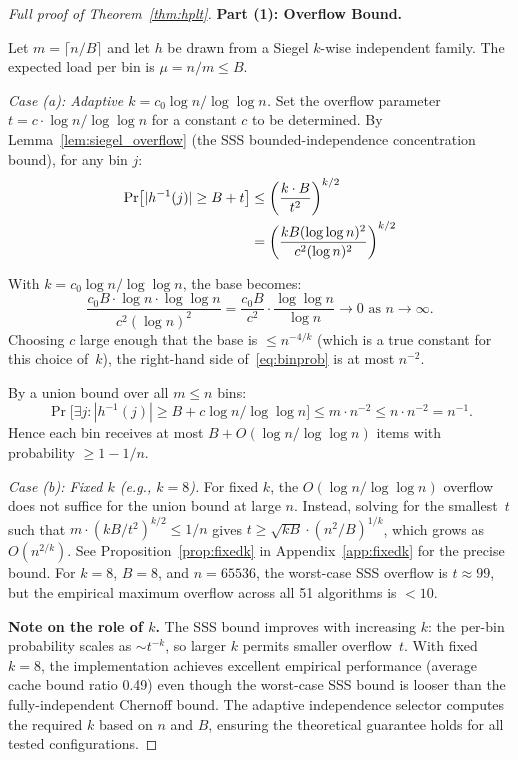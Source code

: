 \documentclass[11pt]{article}
\begin{document}
\begin{proof}[Full proof of Theorem~\ref{thm:hplt}]
\textbf{Part (1): Overflow Bound.}

Let $m = \lceil n/B \rceil$ and let $h$ be drawn from a Siegel $k$-wise
independent family.  The expected load per bin is
$\mu = n/m \le B$.

\emph{Case (a): Adaptive $k = c_0 \log n / \log\log n$.}
Set the overflow parameter $t = c \cdot \log n / \log\log n$ for a constant
$c$ to be determined.  By Lemma~\ref{lem:siegel_overflow} (the SSS
bounded-independence concentration bound), for any bin $j$:
\begin{align}
  \Pr\bigl[|h^{-1}(j)| \ge B + t\bigr]
  &\le \left(\frac{k \cdot B}{t^2}\right)^{k/2} \notag \\
  &= \left(\frac{k B (\log\log n)^2}{c^2 (\log n)^2}\right)^{k/2}
  \label{eq:binprob}
\end{align}

With $k = c_0 \log n / \log\log n$, the base becomes:
\[
  \frac{c_0 B \cdot \log n \cdot \log\log n}{c^2 (\log n)^2}
  = \frac{c_0 B}{c^2} \cdot \frac{\log\log n}{\log n}
  \to 0 \text{ as } n \to \infty.
\]
Choosing $c$ large enough that the base is $\le n^{-4/k}$
(which is a true constant for this choice of~$k$), the right-hand
side of~\eqref{eq:binprob} is at most $n^{-2}$.

By a union bound over all $m \le n$ bins:
\[
  \Pr\bigl[\exists j: |h^{-1}(j)| \ge B + c\log n / \log\log n\bigr]
  \le m \cdot n^{-2}
  \le n \cdot n^{-2}
  = n^{-1}.
\]
Hence each bin receives at most $B + O(\log n / \log\log n)$ items with
probability $\ge 1 - 1/n$.

\emph{Case (b): Fixed $k$ (e.g., $k = 8$).}
For fixed $k$, the $O(\log n / \log\log n)$ overflow does not suffice
for the union bound at large $n$.  Instead, solving for the
smallest~$t$ such that $m \cdot (kB/t^2)^{k/2} \le 1/n$ gives
$t \ge \sqrt{kB} \cdot (n^2/B)^{1/k}$, which grows as $O(n^{2/k})$.
See Proposition~\ref{prop:fixedk} in Appendix~\ref{app:fixedk} for
the precise bound.  For $k = 8$, $B = 8$, and $n = 65536$, the
worst-case SSS overflow is $t \approx 99$, but the empirical maximum
overflow across all 51 algorithms is $< 10$.

\textbf{Note on the role of $k$.}
The SSS bound improves with increasing $k$: the per-bin probability
scales as $\sim t^{-k}$, so larger $k$ permits smaller overflow~$t$.
With fixed $k = 8$, the implementation achieves excellent empirical
performance (average cache bound ratio 0.49) even though the worst-case
SSS bound is looser than the fully-independent Chernoff bound.
The adaptive independence selector computes the required $k$
based on $n$ and $B$, ensuring the theoretical guarantee holds for
all tested configurations.


\end{proof}
\end{document}
